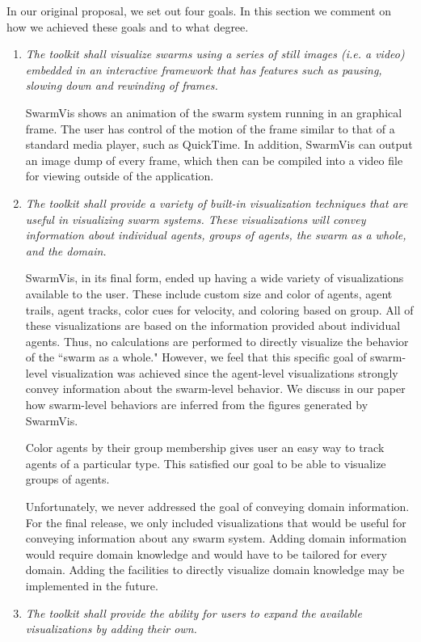 \documentclass{article}
\begin{document}
In our original proposal, we set out four goals. In this section we comment on how we achieved these goals and to what degree.
\begin{enumerate}
\item {\em The toolkit shall visualize swarms using a series of still images (i.e. a video) embedded in an interactive framework that has features such as pausing, slowing down and rewinding of frames.}

SwarmVis shows an animation of the swarm system running in an graphical frame. The user has control of the motion of the frame similar to that of a standard media player, such as QuickTime. In addition, SwarmVis can output an image dump of every frame, which then can be compiled into a video file for viewing outside of the application.

\item {\em The toolkit shall provide a variety of built-in visualization techniques that are useful in visualizing swarm systems. These visualizations will convey information about individual agents, groups of agents, the swarm as a whole, and the domain.}

SwarmVis, in its final form, ended up having a wide variety of visualizations available to the user. These include custom size and color of agents, agent trails, agent tracks, color cues for velocity, and coloring based on group. All of these visualizations are based on the information provided about individual agents. Thus, no calculations are performed to directly visualize the behavior of the ``swarm as a whole." However, we feel that this specific goal of swarm-level visualization was achieved since the agent-level visualizations strongly convey information about the swarm-level behavior. We discuss in our paper how swarm-level behaviors are inferred from the figures generated by SwarmVis.

Color agents by their group membership gives user an easy way to track agents of a particular type. This satisfied our goal to be able to visualize groups of agents.

Unfortunately, we never addressed the goal of conveying domain information. For the final release, we only included visualizations that would be useful for conveying information about any swarm system. Adding domain information would require domain knowledge and would have to be tailored for every domain. Adding the facilities to directly visualize domain knowledge may be implemented in the future.

\item {\em The toolkit shall provide the ability for users to expand the available visualizations by adding their own.}


\end{enumerate}
\end{document}
